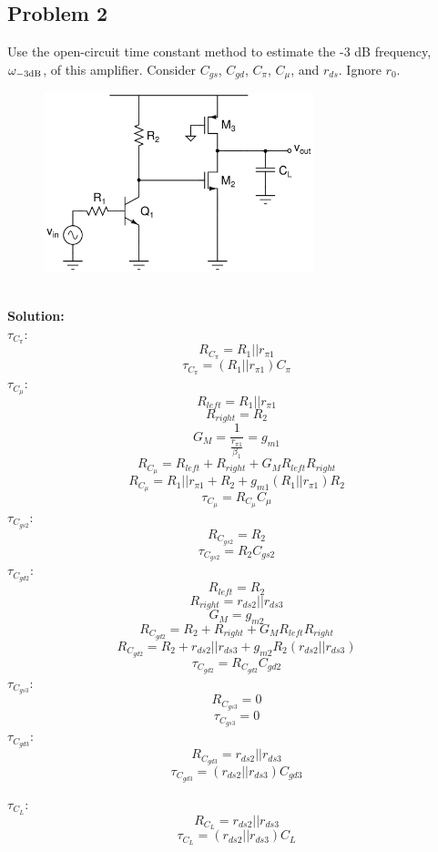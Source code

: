 \documentclass{article}
\begin{document}
\subsection*{Problem 2}
Use the open-circuit time constant method to estimate the -3 dB frequency, $\omega_{\rm -3 dB}$, of this amplifier.  Consider $C_{gs}$, $C_{gd}$, $C_{\pi}$, $C_{\mu}$, and $r_{ds}$.  Ignore $r_0$. \\ 
\begin{figure}[!h]
\begin{center}
    \includegraphics[width=0.7\textwidth]{figures/cc_octc1.jpg}
\end{center}
\end{figure} \\
\textbf{Solution:} \\
$\tau_{C_{\pi}}$:
$$R_{C_{\pi}} = R_1 || r_{\pi 1}$$
$$\boxed{\tau_{C_{\pi}} = \left(R_1 || r_{\pi 1}\right)C_{\pi}}$$
$\tau_{C_{\mu}}$:
$$R_{left} = R_1 || r_{\pi 1}$$
$$R_{right} = R_2$$
$$G_M = \frac{1}{\frac{r_{\pi 1}}{\beta _1}} = g_{m1}$$
$$R_{C_{\mu}} = R_{left} + R_{right} + G_MR_{left}R_{right}$$
$$\boxed{R_{C_{\mu}} = R_1 || r_{\pi 1} + R_2 + g_{m1}\left(R_1 || r_{\pi 1}\right)R_2}$$
$$\boxed{\tau_{C_{\mu}} = R_{C_{\mu}}C_{\mu}}$$
$\tau_{C_{gs2}}$:
$$R_{C_{gs2}} = R_2$$
$$\boxed{\tau_{C_{gs2}} = R_2C_{gs2}}$$
$\tau_{C_{gd2}}$:
$$R_{left} = R_2$$
$$R_{right} = r_{ds2}||r_{ds3}$$
$$G_M = g_{m2}$$
$$R_{C_{gd2}} = R_2 + R_{right} + G_MR_{left}R_{right}$$
$$\boxed{R_{C_{gd2}} = R_2 + r_{ds2}||r_{ds3} + g_{m2}R_2\left(r_{ds2}||r_{ds3}\right)}$$
$$\boxed{\tau_{C_{gd2}} = R_{C_{gd2}}C_{gd2}}$$
$\tau_{C_{gs3}}$:
$$R_{C_{gs3}} = 0$$
$$\boxed{\tau_{C_{gs3}} = 0}$$
$\tau_{C_{gd3}}$:
$$R_{C_{gd3}} = r_{ds2}||r_{ds3}$$
$$\boxed{\tau_{C_{gd3}} = \left(r_{ds2}||r_{ds3}\right)C_{gd3}}$$

$\tau_{C_L}$:
$$R_{C_L} = r_{ds2}||r_{ds3}$$
$$\boxed{\tau_{C_L} = \left(r_{ds2}||r_{ds3}\right)C_{L}}$$
\end{document}
